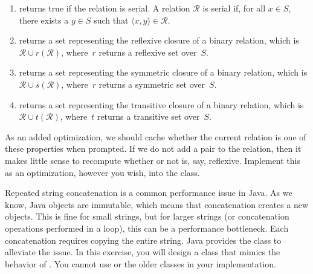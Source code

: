 \begin{enumerate}[label=(\alph*)]
    \item {} returns true if the relation is serial. A relation $\mathcal{R}$ is serial if, for all $x \in S$, there exists a $y \in S$ such that $\langle{x, y}\rangle \in \mathcal{R}$.

    \item {} returns a set representing the reflexive closure of a binary relation, which is $\mathcal{R} \cup r(\mathcal{R})$, where~$r$ returns a reflexive set over~$S$.
    
    \item {} returns a set representing the symmetric closure of a binary relation, which is $\mathcal{R} \cup s(\mathcal{R})$, where~$r$ returns a symmetric set over~$S$.

    \item {} returns a set representing the transitive closure of a binary relation, which is $\mathcal{R} \cup t(\mathcal{R})$, where~$t$ returns a transitive set over~$S$.
\end{enumerate}

As an added optimization, we should cache whether the current relation is one of these properties when prompted. If we do not add a pair to the relation, then it makes little sense to recompute whether or not is, say, reflexive. Implement this as an optimization, however you wish, into the class.

\newpage %
Repeated string concatenation is a common performance issue in Java. 
As we know, Java  objects are immutable, which means that concatenation creates a new  objects. 
This is fine for small strings, but for larger strings (or concatenation operations performed in a loop), this can be a performance bottleneck. 
Each concatenation requires copying the entire string. 
Java provides the  class to alleviate the issue. 
In this exercise, you will design a  class that mimics the behavior of . 
You cannot use  or the older  classes in your implementation.

